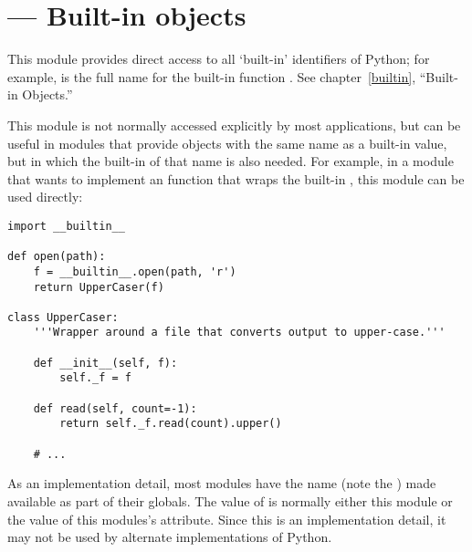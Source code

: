 \section{ ---
         Built-in objects}



This module provides direct access to all `built-in' identifiers of
Python; for example,  is the full name for the
built-in function .  See chapter~\ref{builtin},
``Built-in Objects.''

This module is not normally accessed explicitly by most applications,
but can be useful in modules that provide objects with the same name
as a built-in value, but in which the built-in of that name is also
needed.  For example, in a module that wants to implement an
 function that wraps the built-in ,
this module can be used directly:

\begin{verbatim}
import __builtin__

def open(path):
    f = __builtin__.open(path, 'r')
    return UpperCaser(f)

class UpperCaser:
    '''Wrapper around a file that converts output to upper-case.'''

    def __init__(self, f):
        self._f = f

    def read(self, count=-1):
        return self._f.read(count).upper()

    # ...
\end{verbatim}

As an implementation detail, most modules have the name
 (note the ) made available as part of
their globals.  The value of  is normally either
this module or the value of this modules's 
attribute.  Since this is an implementation detail, it may not be used
by alternate implementations of Python.
